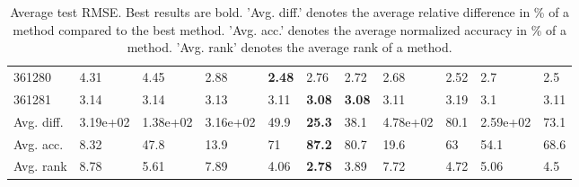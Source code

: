\begin{table}[ht!]
\begin{tabular}{lllllllllll}
  361280 & 4.31 & 4.45 & 2.88 & \textbf{2.48} & 2.76 & 2.72 & 2.68 & 2.52 & 2.7 & 2.5 \\ 
  361281 & 3.14 & 3.14 & 3.13 & 3.11 & \textbf{3.08} & \textbf{3.08} & 3.11 & 3.19 & 3.1 & 3.11 \\ 
   \hline
Avg. diff. & 3.19e+02 & 1.38e+02 & 3.16e+02 & 49.9 & \textbf{25.3} & 38.1 & 4.78e+02 & 80.1 & 2.59e+02 & 73.1 \\ 
  Avg. acc. & 8.32 & 47.8 & 13.9 & 71 & \textbf{87.2} & 80.7 & 19.6 & 63 & 54.1 & 68.6 \\ 
  Avg. rank & 8.78 & 5.61 & 7.89 & 4.06 & \textbf{2.78} & 3.89 & 7.72 & 4.72 & 5.06 & 4.5 \\ 
   \hline
\hline
\end{tabular}
\endgroup
\caption{Average test RMSE. 
                  Best results are bold. 
                  'Avg. diff.' denotes the average relative difference in \% of a method compared to the best method.
                  'Avg. acc.' denotes the average normalized accuracy in \% of a method.
                  'Avg. rank' denotes the average rank of a method.} 
\label{TABLES/table_results_RMSE_spatial_depth}
\end{table}
